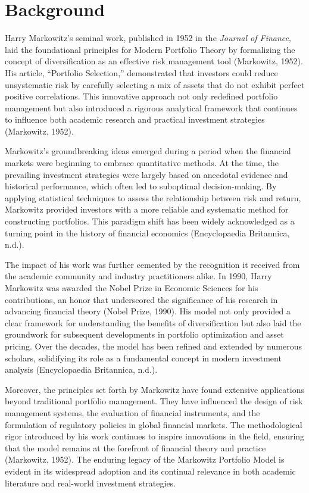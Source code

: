 \documentclass[11pt]{article}
\begin{document}
\section{Background}
Harry Markowitz's seminal work, published in 1952 in the \textit{Journal of Finance}, laid the foundational principles for Modern Portfolio Theory by formalizing the concept of diversification as an effective risk management tool (Markowitz, 1952). His article, ``Portfolio Selection,'' demonstrated that investors could reduce unsystematic risk by carefully selecting a mix of assets that do not exhibit perfect positive correlations. This innovative approach not only redefined portfolio management but also introduced a rigorous analytical framework that continues to influence both academic research and practical investment strategies (Markowitz, 1952).

Markowitz’s groundbreaking ideas emerged during a period when the financial markets were beginning to embrace quantitative methods. At the time, the prevailing investment strategies were largely based on anecdotal evidence and historical performance, which often led to suboptimal decision-making. By applying statistical techniques to assess the relationship between risk and return, Markowitz provided investors with a more reliable and systematic method for constructing portfolios. This paradigm shift has been widely acknowledged as a turning point in the history of financial economics (Encyclopaedia Britannica, n.d.).

The impact of his work was further cemented by the recognition it received from the academic community and industry practitioners alike. In 1990, Harry Markowitz was awarded the Nobel Prize in Economic Sciences for his contributions, an honor that underscored the significance of his research in advancing financial theory (Nobel Prize, 1990). His model not only provided a clear framework for understanding the benefits of diversification but also laid the groundwork for subsequent developments in portfolio optimization and asset pricing. Over the decades, the model has been refined and extended by numerous scholars, solidifying its role as a fundamental concept in modern investment analysis (Encyclopaedia Britannica, n.d.).

Moreover, the principles set forth by Markowitz have found extensive applications beyond traditional portfolio management. They have influenced the design of risk management systems, the evaluation of financial instruments, and the formulation of regulatory policies in global financial markets. The methodological rigor introduced by his work continues to inspire innovations in the field, ensuring that the model remains at the forefront of financial theory and practice (Markowitz, 1952). The enduring legacy of the Markowitz Portfolio Model is evident in its widespread adoption and its continual relevance in both academic literature and real-world investment strategies.
\end{document}
